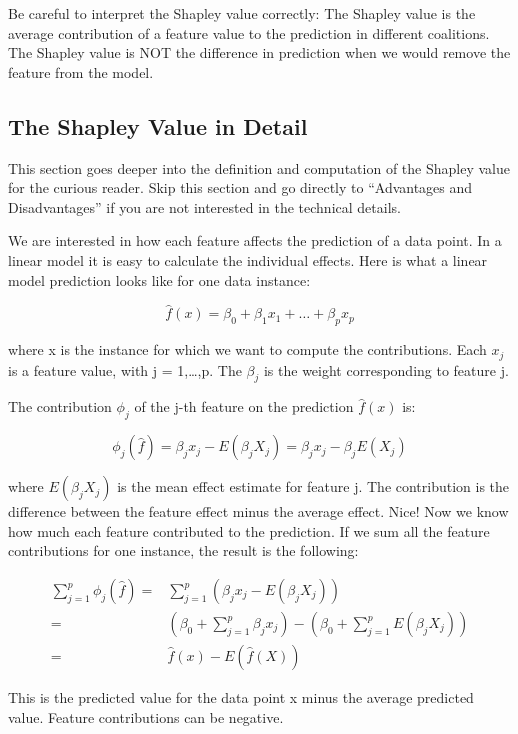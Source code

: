 \documentclass[
  12pt,
]{krantz}
\begin{document}
Be careful to interpret the Shapley value correctly:
The Shapley value is the average contribution of a feature value to the prediction in different coalitions.
The Shapley value is NOT the difference in prediction when we would remove the feature from the model.

\hypertarget{the-shapley-value-in-detail}{%
\subsection{The Shapley Value in Detail}\label{the-shapley-value-in-detail}}

This section goes deeper into the definition and computation of the Shapley value for the curious reader.
Skip this section and go directly to ``Advantages and Disadvantages'' if you are not interested in the technical details.

We are interested in how each feature affects the prediction of a data point.
In a linear model it is easy to calculate the individual effects.
Here is what a linear model prediction looks like for one data instance:

\[\hat{f}(x)=\beta_0+\beta_{1}x_{1}+\ldots+\beta_{p}x_{p}\]

where x is the instance for which we want to compute the contributions.
Each \(x_j\) is a feature value, with j = 1,\ldots,p.
The \(\beta_j\) is the weight corresponding to feature j.

The contribution \(\phi_j\) of the j-th feature on the prediction \(\hat{f}(x)\) is:

\[\phi_j(\hat{f})=\beta_{j}x_j-E(\beta_{j}X_{j})=\beta_{j}x_j-\beta_{j}E(X_{j})\]

where \(E(\beta_jX_{j})\) is the mean effect estimate for feature j.
The contribution is the difference between the feature effect minus the average effect.
Nice!
Now we know how much each feature contributed to the prediction.
If we sum all the feature contributions for one instance, the result is the following:

\begin{align*}\sum_{j=1}^{p}\phi_j(\hat{f})=&\sum_{j=1}^p(\beta_{j}x_j-E(\beta_{j}X_{j}))\\=&(\beta_0+\sum_{j=1}^p\beta_{j}x_j)-(\beta_0+\sum_{j=1}^{p}E(\beta_{j}X_{j}))\\=&\hat{f}(x)-E(\hat{f}(X))\end{align*}

This is the predicted value for the data point x minus the average predicted value.
Feature contributions can be negative.
\end{document}
